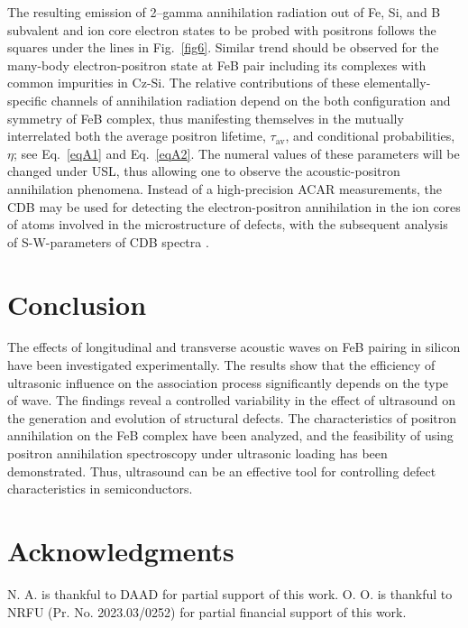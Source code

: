 \documentclass{ttp}
\begin{document}
The resulting emission of 2–gamma annihilation radiation out of Fe, Si, and B subvalent and ion core electron states
to be probed with positrons follows the squares under the lines in Fig.~\ref{fig6}.
Similar trend should be observed for the many-body electron-positron state at FeB pair including its complexes with common impurities in Cz-Si.
The relative contributions of these elementally-specific channels of annihilation radiation depend on the both configuration and symmetry of FeB complex,
thus manifesting themselves in the mutually interrelated both the average positron lifetime,
$\tau_\mathrm{av}$, and conditional probabilities, $\eta$;
see Eq.~\ref{eqA1} and Eq.~\ref{eqA2}.
The numeral values of these parameters will be changed under USL,
thus allowing one to observe the acoustic-positron annihilation phenomena.
Instead of a high-precision ACAR measurements, the CDB may be used for detecting the electron-positron annihilation in the ion cores
of atoms involved in the microstructure of defects, with the subsequent analysis of S-W-parameters of CDB spectra \cite{Krause1999}.

\section{Conclusion}

The effects of longitudinal and transverse acoustic waves on FeB pairing in silicon have been investigated experimentally.
The results show that the efficiency of ultrasonic influence on the association process significantly depends on the type of wave.
The findings reveal a controlled variability in the effect of ultrasound on the generation and evolution of structural defects.
The characteristics of positron annihilation on the FeB complex have been analyzed, 
and the feasibility of using positron annihilation spectroscopy under ultrasonic loading has been demonstrated.
Thus, ultrasound can be an effective tool for controlling defect characteristics in semiconductors.



\section{Acknowledgments}
N. A. is thankful to DAAD for partial support of this work.
O. O. is thankful to NRFU (Pr. No. 2023.03/0252) for partial financial support of this work.
\end{document}
